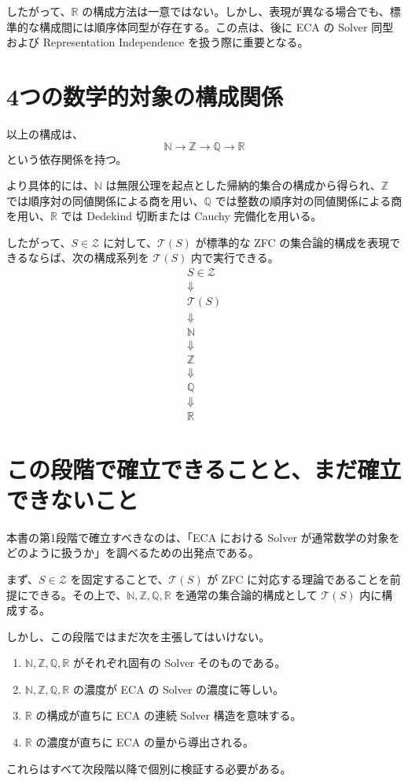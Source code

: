 \documentclass[a4paper,11pt]{article}
\begin{document}
したがって、$\mathbb{R}$ の構成方法は一意ではない。しかし、表現が異なる場合でも、標準的な構成間には順序体同型が存在する。この点は、後に ECA の Solver 同型および Representation Independence を扱う際に重要となる。

\section{4つの数学的対象の構成関係}
以上の構成は、
\[
\boxed{\mathbb{N}\longrightarrow\mathbb{Z}\longrightarrow\mathbb{Q}\longrightarrow\mathbb{R}}
\]
という依存関係を持つ。

より具体的には、$\mathbb{N}$ は無限公理を起点とした帰納的集合の構成から得られ、$\mathbb{Z}$ では順序対の同値関係による商を用い、$\mathbb{Q}$ では整数の順序対の同値関係による商を用い、$\mathbb{R}$ では Dedekind 切断または Cauchy 完備化を用いる。

したがって、$S\in\mathcal{Z}$ に対して、$\mathcal{T}(S)$ が標準的な ZFC の集合論的構成を表現できるならば、次の構成系列を $\mathcal{T}(S)$ 内で実行できる。
\[
\boxed{\begin{array}{c}S\in\mathcal{Z}\\\Downarrow\\\mathcal{T}(S)\\\Downarrow\\\mathbb{N}\\\Downarrow\\\mathbb{Z}\\\Downarrow\\\mathbb{Q}\\\Downarrow\\\mathbb{R}\end{array}}
\]

\section{この段階で確立できることと、まだ確立できないこと}
本書の第1段階で確立すべきなのは、「ECA における Solver が通常数学の対象をどのように扱うか」を調べるための出発点である。

まず、$S\in\mathcal{Z}$ を固定することで、$\mathcal{T}(S)$ が ZFC に対応する理論であることを前提にできる。その上で、$\mathbb{N},\mathbb{Z},\mathbb{Q},\mathbb{R}$ を通常の集合論的構成として $\mathcal{T}(S)$ 内に構成する。

しかし、この段階ではまだ次を主張してはいけない。
\begin{enumerate}
\item $\mathbb{N},\mathbb{Z},\mathbb{Q},\mathbb{R}$ がそれぞれ固有の Solver そのものである。
\item $\mathbb{N},\mathbb{Z},\mathbb{Q},\mathbb{R}$ の濃度が ECA の Solver の濃度に等しい。
\item $\mathbb{R}$ の構成が直ちに ECA の連続 Solver 構造を意味する。
\item $\mathbb{R}$ の濃度が直ちに ECA の量から導出される。
\end{enumerate}
これらはすべて次段階以降で個別に検証する必要がある。
\end{document}
